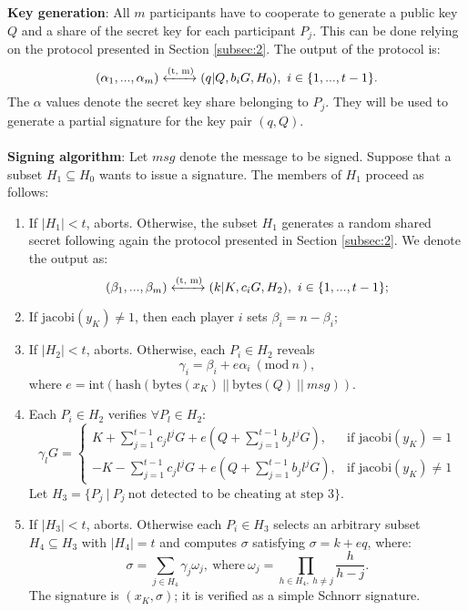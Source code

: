 \bigskip
\noindent
{\bf Key generation}: All $m$ participants have to cooperate to generate a public key $Q$ and a share of the secret key for each participant $P_j$. This can be done relying on the protocol presented in Section \ref{subsec:2}. The output of the protocol is:
$$(\alpha_1, ..., \alpha_m) \xleftrightarrow{\text{(t, m)}} (q|Q, b_iG, H_0), \ i \in \{1, ..., t - 1\}.$$
The $\alpha$ values denote the secret key share belonging to $P_j$. They will be used to generate a partial signature for the key pair $(q, Q)$.
\\
\\
{\bf Signing algorithm}: Let $msg$ denote the message to be signed. Suppose that a subset $H_1 \subseteq H_0$ wants to issue a signature. The members of $H_1$ proceed as follows:
\begin{enumerate}
	\item If $|H_1| < t$, aborts. Otherwise, the subset $H_1$ generates a random shared secret following again the protocol presented in Section \ref{subsec:2}. We denote the output as:
	$$(\beta_1, ..., \beta_m) \xleftrightarrow{\text{(t, m)}} (k|K, c_iG, H_2), \ i \in \{1, ..., t - 1\};$$
	\item If $\text{jacobi}(y_K) \neq 1$, then each player $i$ sets $\beta_i = n - \beta_i$;
	\item If $|H_2| < t$, aborts. Otherwise, each $P_i \in H_2$ reveals
	$$\gamma_i = \beta_i + e\alpha_i \ (\text{mod} \ n),$$
	where $e = \text{int}(\text{hash}(\text{bytes}(x_K) \ || \ \text{bytes}(Q) \ || \ msg))$.
	\item Each $P_i \in H_2$ verifies $\forall P_l \in H_2$:
	$$\gamma_lG = \begin{cases} K + \sum_{j = 1}^{t - 1} c_jl^jG + e\left(Q + \sum_{j = 1}^{t - 1}b_jl^jG\right), & \mbox{if } \text{jacobi}(y_K) = 1 \\ - K -\sum_{j = 1}^{t - 1} c_jl^jG + e\left(Q + \sum_{j = 1}^{t - 1}b_jl^jG\right), & \mbox{if } \text{jacobi}(y_K) \neq 1 \end{cases}$$
	Let $H_3 = \{P_j \ | \ P_j \ \text{not detected to be cheating at step 3}\}$.
	\item If $|H_3| < t$, aborts. Otherwise each $P_i \in H_3$ selects an arbitrary subset $H_4 \subseteq H_3$ with $|H_4| = t$ and computes $\sigma$ satisfying $\sigma = k + eq$, where:
	$$\sigma = \sum_{j \in H_4}\gamma_j\omega_j, \ \text{where} \ \omega_j = \prod_{h \in H_4, \ h \neq j}\frac{h}{h - j}.$$
	The signature is $(x_K, \sigma)$; it is verified as a simple Schnorr signature.
\end{enumerate}
